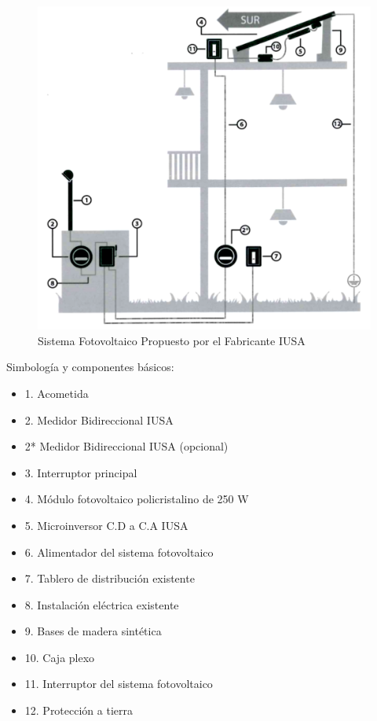 \begin{figure}[H]
	\centering
	\includegraphics[scale=.4]{Capitulo2/images/sistema-fotovoltaico.png}
	\caption{Sistema Fotovoltaico Propuesto por el Fabricante IUSA}
	\label{fig:sistema fotovoltaicoa IUSA}
\end{figure}

Simbología y componentes básicos:
\begin{itemize}
	\item 1. Acometida
	\item 2. Medidor Bidireccional IUSA
	\item 2* Medidor Bidireccional IUSA (opcional)
	\item 3. Interruptor principal
	\item 4. Módulo fotovoltaico policristalino de 250 W
	\item 5. Microinversor C.D a C.A IUSA
	\item 6. Alimentador del sistema fotovoltaico
	\item 7. Tablero de distribución existente
	\item 8. Instalación eléctrica existente
	\item 9. Bases de madera sintética
	\item 10. Caja plexo
	\item 11. Interruptor del sistema fotovoltaico
	\item 12. Protección a tierra
\end{itemize}

